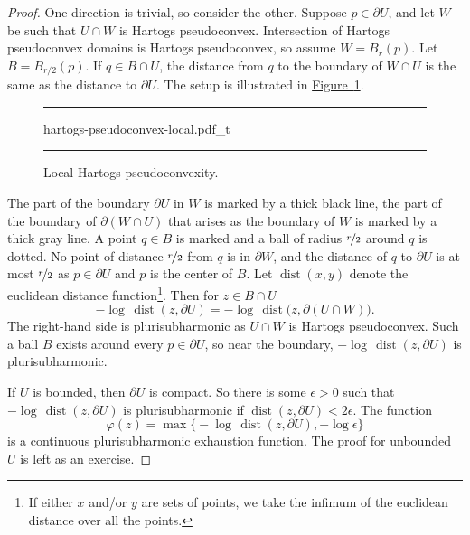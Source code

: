 \documentclass[12pt,openany]{book}
\theoremstyle{plain}
\theoremstyle{remark}
\theoremstyle{definition}
\newenvironment{myfig}{%
\begin{figure}[h!t]
\noindent\rule{\textwidth}{0.5pt}\vspace{12pt}\par\centering}%
{\par\noindent\rule{\textwidth}{0.5pt}
\end{figure}}
\theoremstyle{exercise}
\theoremstyle{example}
\newcommand{\figureref}[1]{\hyperref[#1]{Figure~\ref*{#1}}}
\begin{document}
\begin{proof}
One direction is trivial, so consider the other.
Suppose $p \in \partial U$, and let
$W$ be such that $U \cap W$
is Hartogs pseudoconvex.  Intersection of
Hartogs pseudoconvex domains is Hartogs pseudoconvex, so
assume $W = B_r(p)$.
Let $B = B_{r/2}(p)$.  If $q \in B \cap U$, the distance from $q$ to the boundary of $W \cap U$ is the same as
the distance to $\partial U$.  The setup is illustrated in
\figureref{fig:hartogs-pseudoconvex-local}.

\begin{myfig}
{hartogs-pseudoconvex-local.pdf_t}
\caption{Local Hartogs pseudoconvexity.\label{fig:hartogs-pseudoconvex-local}}
\end{myfig}

The part of the boundary $\partial U$ in $W$ is marked by a thick
black line, the part of the boundary of $\partial (W \cap U)$ that arises as
the boundary of $W$ is marked by a thick gray line.  A point $q \in B$ is
marked and a ball of radius $\nicefrac{r}{2}$ around $q$ is dotted.
No point of distance $\nicefrac{r}{2}$ from $q$ is in $\partial W$, and 
the distance of $q$ to $\partial U$ is at most $\nicefrac{r}{2}$ as $p \in \partial U$
and $p$ is the center of $B$.
%
Let $\operatorname{dist}(x,y)$ denote the
euclidean distance function\footnote{If either $x$ and/or $y$ are sets
of points, we take the infimum of the euclidean distance over all the points.}.
Then for $z \in B \cap U$
\begin{equation*}
- \log \, \operatorname{dist}(z, \partial U) = 
- \log \, \operatorname{dist}\bigl(z, \partial (U \cap W)\bigr).
\end{equation*}
The right-hand side is plurisubharmonic as $U \cap W$ is Hartogs
pseudoconvex.  Such a ball $B$ exists around every $p \in \partial U$, so near
the boundary, $- \log \, \operatorname{dist}(z, \partial U)$ is
plurisubharmonic.

If $U$ is bounded, then $\partial U$ is compact.  So there is some
$\epsilon > 0$ such that $- \log \, \operatorname{dist}(z, \partial U)$
is plurisubharmonic if $\operatorname{dist}(z, \partial U) < 2\epsilon$.
The function
\begin{equation*}
\varphi(z) = \max \bigl\{
- \log \, \operatorname{dist}(z, \partial U) , - \log \epsilon \bigr\} 
\end{equation*}
is a continuous plurisubharmonic exhaustion function.
The proof for
unbounded $U$ is left as an exercise.
\end{proof}
\end{document}
